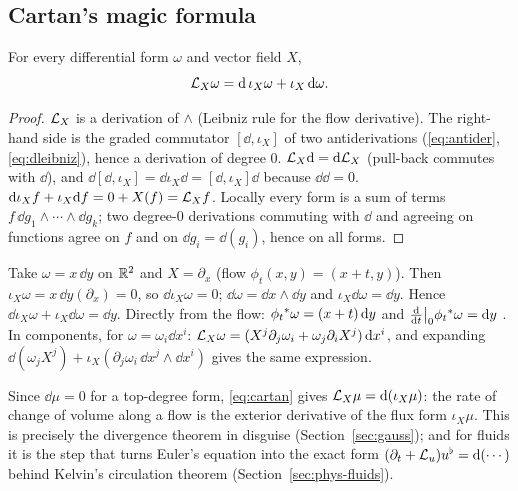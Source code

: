 \subsection{Cartan's magic formula}\label{sec:cartan}

\begin{theorem}[Cartan]\label{thm:cartan}
For every differential form $\omega$ and vector field $X$,
\begin{equation}\label{eq:cartan}
\mathcal{L}_X\omega=\mathrm{d}\,\iota_X\omega+\iota_X\,\mathrm{d}\omega .
\end{equation}
\end{theorem}
\begin{proof}
 $\mathcal{L}_X$ is a derivation of $\wedge$ (Leibniz rule for the flow derivative). The right-hand side is the graded commutator $[\dd,\iota_X]$ of two antiderivations (\eqref{eq:antider}, \eqref{eq:dleibniz}), hence a derivation of degree $0$.
 $\mathcal{L}_X\mathrm{d}=\mathrm{d}\mathcal{L}_X$ (pull-back commutes with $\dd$), and $\dd[\dd,\iota_X]=\dd\iota_X\dd=[\dd,\iota_X]\dd$ because $\dd\dd=0$.
 $\mathrm{d}\iota_Xf+\iota_X\mathrm{d} f=0+X(f)=\mathcal{L}_Xf$.
 Locally every form is a sum of terms $f\,\dd g_1\wedge\cdots\wedge\dd g_k$; two degree-$0$ derivations commuting with $\dd$ and agreeing on functions agree on $f$ and on $\dd g_i=\dd(g_i)$, hence on all forms.
\end{proof}

\begin{example}\label{ex:cartan1}
Take $\omega=x\,\dd y$ on $\mathbb{R}^2$ and $X=\partial_x$ (flow $\phi_t(x,y)=(x+t,y)$). Then $\iota_X\omega=x\,\dd y(\partial_x)=0$, so $\dd\iota_X\omega=0$; $\dd\omega=\dd x\wedge\dd y$ and $\iota_X\dd\omega=\dd y$. Hence $\dd\iota_X\omega+\iota_X\dd\omega=\dd y$.
Directly from the flow: $\phi_t{}^{*}\omega=(x+t)\,\mathrm{d} y$ and $\frac{\mathrm{d}}{\mathrm{d} t}\big|_0\phi_t{}^{*}\omega=\mathrm{d} y$ \checkmark.
In components, for $\omega=\omega_i\dd x^i$: $\mathcal{L}_X\omega=(X^j\partial_j\omega_i+\omega_j\partial_iX^j)\,\mathrm{d} x^i$, and expanding $\dd(\omega_jX^j)+\iota_X(\partial_j\omega_i\,\dd x^j\wedge\dd x^i)$ gives the same expression.
\end{example}

\begin{remark}
Since $\dd\mu=0$ for a top-degree form, \eqref{eq:cartan} gives $\mathcal{L}_X\mu=\mathrm{d}(\iota_X\mu)$: the rate of change of volume along a flow is the exterior derivative of the flux form $\iota_X\mu$. This is precisely the divergence theorem in disguise (Section~\ref{sec:gauss}); and for fluids it is the step that turns Euler's equation into the exact form $(\partial_t+\mathcal{L}_u)u^\flat=\mathrm{d}(\cdots)$ behind Kelvin's circulation theorem (Section~\ref{sec:phys-fluids}).
\end{remark}
